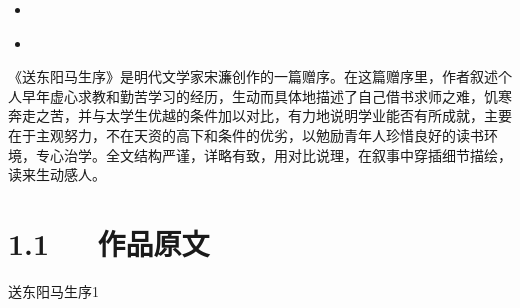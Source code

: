 \documentclass[letterpaper,10pt,english]{sphinxmanual}
\begin{document}
\begin{sphinxShadowBox}
\begin{itemize}
\begin{itemize}
\begin{itemize}
\item {} 
\label{\detokenize{p01_u6563_u6587/_u5b8b_u6fc2-_u9001_u4e1c_u9633_u9a6c_u751f_u5e8f:id21}}{\hyperref[\detokenize{p01_u6563_u6587/_u5b8b_u6fc2-_u9001_u4e1c_u9633_u9a6c_u751f_u5e8f:id9}]{}}

\item {} 
\label{\detokenize{p01_u6563_u6587/_u5b8b_u6fc2-_u9001_u4e1c_u9633_u9a6c_u751f_u5e8f:id22}}{\hyperref[\detokenize{p01_u6563_u6587/_u5b8b_u6fc2-_u9001_u4e1c_u9633_u9a6c_u751f_u5e8f:id10}]{}}

\item {} 
\label{\detokenize{p01_u6563_u6587/_u5b8b_u6fc2-_u9001_u4e1c_u9633_u9a6c_u751f_u5e8f:id23}}{\hyperref[\detokenize{p01_u6563_u6587/_u5b8b_u6fc2-_u9001_u4e1c_u9633_u9a6c_u751f_u5e8f:id11}]{}}

\end{itemize}

\item {} 
\label{\detokenize{p01_u6563_u6587/_u5b8b_u6fc2-_u9001_u4e1c_u9633_u9a6c_u751f_u5e8f:id24}}{\hyperref[\detokenize{p01_u6563_u6587/_u5b8b_u6fc2-_u9001_u4e1c_u9633_u9a6c_u751f_u5e8f:id12}]{}}

\item {} 
\label{\detokenize{p01_u6563_u6587/_u5b8b_u6fc2-_u9001_u4e1c_u9633_u9a6c_u751f_u5e8f:id25}}{\hyperref[\detokenize{p01_u6563_u6587/_u5b8b_u6fc2-_u9001_u4e1c_u9633_u9a6c_u751f_u5e8f:id13}]{}}

\end{itemize}

\end{itemize}
\end{sphinxShadowBox}

《送东阳马生序》是明代文学家宋濂创作的一篇赠序。在这篇赠序里，作者叙述个人早年虚心求教和勤苦学习的经历，生动而具体地描述了自己借书求师之难，饥寒奔走之苦，并与太学生优越的条件加以对比，有力地说明学业能否有所成就，主要在于主观努力，不在天资的高下和条件的优劣，以勉励青年人珍惜良好的读书环境，专心治学。全文结构严谨，详略有致，用对比说理，在叙事中穿插细节描绘，读来生动感人。


\section{1.1   作品原文}
\label{\detokenize{p01_u6563_u6587/_u5b8b_u6fc2-_u9001_u4e1c_u9633_u9a6c_u751f_u5e8f:id3}}
送东阳马生序1
\end{document}
